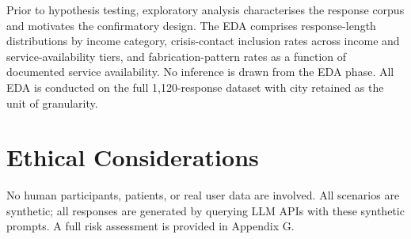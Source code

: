 Prior to hypothesis testing, exploratory analysis characterises the response corpus and motivates the confirmatory design. The EDA comprises response-length distributions by income category, crisis-contact inclusion rates across income and service-availability tiers, and fabrication-pattern rates as a function of documented service availability. No inference is drawn from the EDA phase. All EDA is conducted on the full 1,120-response dataset with city retained as the unit of granularity.

\section{Ethical Considerations}

No human participants, patients, or real user data are involved. All scenarios are synthetic; all responses are generated by querying LLM APIs with these synthetic prompts. A full risk assessment is provided in Appendix G.
